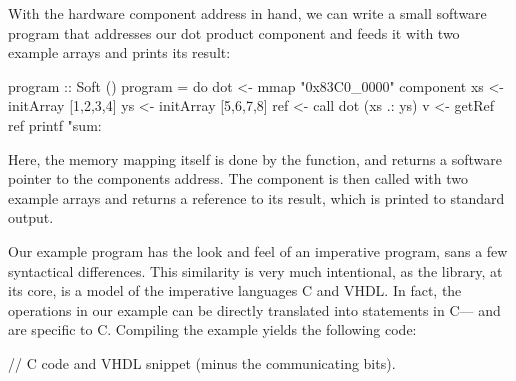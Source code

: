 \documentclass[../main.tex]{subfiles}
\begin{document}
With the hardware component address in hand, we can write a small software program that addresses our dot product component and feeds it with two example arrays and prints its result:

\begin{code}
program :: Soft ()
program = do
  dot <- mmap "0x83C0_0000" component
  xs  <- initArray [1,2,3,4]
  ys  <- initArray [5,6,7,8]
  ref <- call dot (xs .: ys)
  v   <- getRef ref
  printf "sum: %
\end{code}

\noindent Here, the memory mapping itself is done by the  function, and returns a software pointer to the components address. The component is then called with two example arrays and returns a reference to its result, which is printed to standard output.

Our example program has the look and feel of an imperative program, sans a few syntactical differences. This similarity is very much intentional, as the library, at its core, is a model of the imperative languages C and VHDL. In fact, the operations in our example can be directly translated into statements in C--- and  are specific to C. Compiling the example yields the following code:


\begin{code}
// C code and VHDL snippet (minus the communicating bits).
\end{code}




\end{document}
